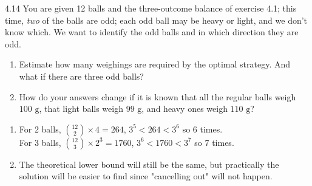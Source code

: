 \documentclass[12pt, a4paper]{article}
\begin{document}
\begin{prob}{4.14}
    You are given 12 balls and the three-outcome balance of exercise 4.1; this time, \textit{two} of the balls are odd; each odd ball may be heavy or light, and we don't know which. We want to identify the odd balls and in which direction they are odd.
\begin{enumerate}
    \item[(a)] Estimate how many weighings are required by the optimal strategy. And what if there are three odd balls?
    \item[(b)] How do your answers change if it is known that all the regular balls weigh $100\text{ g}$, that light balls weigh $99\text{ g}$, and heavy ones weigh $110\text{ g}$?
\end{enumerate}
\end{prob}
\begin{sol}
    \begin{enumerate}
    \item[(a)] For 2 balls, $\binom{12}{2} \times 4 = 264$, $ 3^5 < 264 < 3^6 $ so 6 times. \\
    
    For 3 balls, $\binom{12}{3} \times 2^3 = 1760$, $3^6 < 1760 < 3^7$ so 7 times.
    \item[(b)] The theoretical lower bound will still be the same, but practically the solution will be easier to find since "cancelling out" will not happen.
\end{enumerate}
\end{sol}
\bigskip
\end{document}
